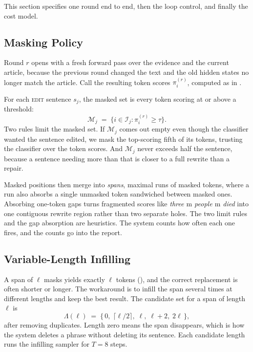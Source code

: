 \documentclass[]{paper}
\newcommand{\mask}{\ensuremath{\mathrm{m}}}
\newcommand{\edit}{\textsc{edit}}
\begin{document}
This section specifies one round end to end, then the loop control, and finally the cost model.

\subsection{Masking Policy}
\label{sec:maskpolicy}

Round $r$ opens with a fresh forward pass over the evidence and the current article, because the previous round changed the text and the old hidden states no longer match the article. Call the resulting token scores $\pi_i^{(r)}$, computed as in .

For each \edit{} sentence $s_j$, the masked set is every token scoring at or above a threshold:
\begin{equation}
\mathcal{M}_j \;=\; \big\{ i \in \mathcal{I}_j : \pi_i^{(r)} \ge \tau \big\}.
\label{eq:maskset}
\end{equation}
Two rules limit the masked set. If $\mathcal{M}_j$ comes out empty even though the classifier wanted the sentence edited, we mask the top-scoring fifth of its tokens, trusting the classifier over the token scores. And $\mathcal{M}_j$ never exceeds half the sentence, because a sentence needing more than that is closer to a full rewrite than a repair.

Masked positions then merge into \emph{spans}, maximal runs of masked tokens, where a run also absorbs a single unmasked token sandwiched between masked ones. Absorbing one-token gaps turns fragmented scores like \emph{three \mask{} people \mask{} died} into one contiguous rewrite region rather than two separate holes. The two limit rules and the gap absorption are heuristics. The system counts how often each one fires, and the counts go into the report.

\subsection{Variable-Length Infilling}
\label{sec:infill}

A span of $\ell$ masks yields exactly $\ell$ tokens (), and the correct replacement is often shorter or longer. The workaround is to infill the span several times at different lengths and keep the best result. The candidate set for a span of length $\ell$ is
\begin{equation}
\Lambda(\ell) \;=\; \{\,0,\; \lceil \ell/2 \rceil,\; \ell,\; \ell + 2,\; 2\ell\,\},
\label{eq:lambda}
\end{equation}
after removing duplicates. Length zero means the span disappears, which is how the system deletes a phrase without deleting its sentence. Each candidate length runs the infilling sampler for $T = 8$ steps.
\end{document}
